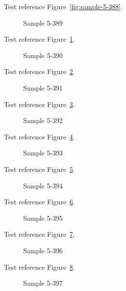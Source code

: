 Test reference Figure~\ref{fig:sample-5-388}.

\begin{figure}[tbhp]
\caption{Sample 5-389}
\label{fig:sample-5-389}
\end{figure}

Test reference Figure~\ref{fig:sample-5-389}.

\begin{figure}[tbhp]
\caption{Sample 5-390}
\label{fig:sample-5-390}
\end{figure}

Test reference Figure~\ref{fig:sample-5-390}.

\begin{figure}[tbhp]
\caption{Sample 5-391}
\label{fig:sample-5-391}
\end{figure}

Test reference Figure~\ref{fig:sample-5-391}.

\begin{figure}[tbhp]
\caption{Sample 5-392}
\label{fig:sample-5-392}
\end{figure}

Test reference Figure~\ref{fig:sample-5-392}.

\begin{figure}[tbhp]
\caption{Sample 5-393}
\label{fig:sample-5-393}
\end{figure}

Test reference Figure~\ref{fig:sample-5-393}.

\begin{figure}[tbhp]
\caption{Sample 5-394}
\label{fig:sample-5-394}
\end{figure}

Test reference Figure~\ref{fig:sample-5-394}.

\begin{figure}[tbhp]
\caption{Sample 5-395}
\label{fig:sample-5-395}
\end{figure}

Test reference Figure~\ref{fig:sample-5-395}.

\begin{figure}[tbhp]
\caption{Sample 5-396}
\label{fig:sample-5-396}
\end{figure}

Test reference Figure~\ref{fig:sample-5-396}.

\begin{figure}[tbhp]
\caption{Sample 5-397}
\label{fig:sample-5-397}
\end{figure}

